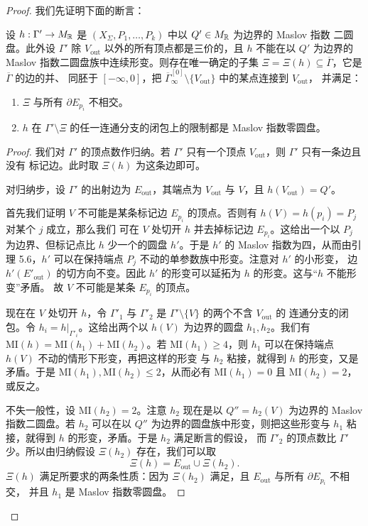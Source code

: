 \begin{proof}
我们先证明下面的断言：

设 $h : \Gamma' \to M_{\mathbb{R}}$ 是 $(X_\Sigma,P_1,\dots,P_k)$ 中以 $Q'\in M_{\mathbb{R}}$ 为边界的 Maslov 指数
二圆盘。此外设 $\Gamma'$ 除 $V_{\mathrm{out}}$ 以外的所有顶点都是三价的，且 $h$ 不能在以 $Q'$ 为边界的
Maslov 指数二圆盘族中连续形变。则存在唯一确定的子集 $\Xi = \Xi(h)\subseteq\overline\Gamma$，它是 $\overline\Gamma$ 的边的并、
同胚于 $[-\infty,0]$，把 $\overline\Gamma^{[0]}_\infty\setminus\{V_{\mathrm{out}}\}$ 中的某点连接到 $V_{\mathrm{out}}$，
并满足：
\begin{enumerate}[label=(\arabic*),leftmargin=*]
\item $\Xi$ 与所有 $\partial E_{p_i}$ 不相交。
\item $h$ 在 $\Gamma'\setminus\Xi$ 的任一连通分支的闭包上的限制都是 Maslov 指数零圆盘。
\end{enumerate}

\begin{proof}
我们对 $\Gamma'$ 的顶点数作归纳。若 $\Gamma'$ 只有一个顶点 $V_{\mathrm{out}}$，则 $\Gamma'$ 只有一条边且没有
标记边。此时取 $\Xi(h)$ 为这条边即可。

对归纳步，设 $\Gamma'$ 的出射边为 $E_{\mathrm{out}}$，其端点为 $V_{\mathrm{out}}$ 与 $V$，且
$h(V_{\mathrm{out}}) = Q'$。

首先我们证明 $V$ 不可能是某条标记边 $E_{p_i}$ 的顶点。否则有 $h(V) = h(p_i) = P_j$ 对某个 $j$ 成立，那么我们
可在 $V$ 处切开 $h$ 并去掉标记边 $E_{p_i}$。这给出一个以 $P_j$ 为边界、但标记点比 $h$ 少一个的圆盘 $h'$。于是
$h'$ 的 Maslov 指数为四，从而由引理 5.6，$h'$ 可以在保持端点 $P_j$ 不动的单参数族中形变。注意对 $h'$ 的小形变，
边 $h'(E'_{\mathrm{out}})$ 的切方向不变。因此 $h'$ 的形变可以延拓为 $h$ 的形变。这与“$h$ 不能形变”矛盾。
故 $V$ 不可能是某条 $E_{p_i}$ 的顶点。

现在在 $V$ 处切开 $h$，令 $\Gamma'_1$ 与 $\Gamma'_2$ 是 $\Gamma'\setminus\{V\}$ 的两个不含 $V_{\mathrm{out}}$ 的
连通分支的闭包。令 $h_i = h|_{\Gamma'_i}$。这给出两个以 $h(V)$ 为边界的圆盘 $h_1,h_2$。我们有
$\mathrm{MI}(h) = \mathrm{MI}(h_1)+\mathrm{MI}(h_2)$。若 $\mathrm{MI}(h_1)\ge4$，则 $h_1$ 可以在保持端点 $h(V)$ 不动的情形下形变，再把这样的形变
与 $h_2$ 粘接，就得到 $h$ 的形变，又是矛盾。于是 $\mathrm{MI}(h_1),\mathrm{MI}(h_2)\le2$，从而必有 $\mathrm{MI}(h_1)=0$ 且
$\mathrm{MI}(h_2)=2$，或反之。

不失一般性，设 $\mathrm{MI}(h_2)=2$。注意 $h_2$ 现在是以 $Q'' = h_2(V)$ 为边界的 Maslov 指数二圆盘。若 $h_2$ 可以在以
$Q''$ 为边界的圆盘族中形变，则把这些形变与 $h_1$ 粘接，就得到 $h$ 的形变，矛盾。于是 $h_2$ 满足断言的假设，
而 $\Gamma'_2$ 的顶点数比 $\Gamma'$ 少。所以由归纳假设 $\Xi(h_2)$ 存在，我们可以取
\[
\Xi(h) = E_{\mathrm{out}}\cup\Xi(h_2).
\]
$\Xi(h)$ 满足所要求的两条性质：因为 $\Xi(h_2)$ 满足，且 $E_{\mathrm{out}}$ 与所有 $\partial E_{p_i}$ 不相交，
并且 $h_1$ 是 Maslov 指数零圆盘。
\end{proof}


\end{proof}
